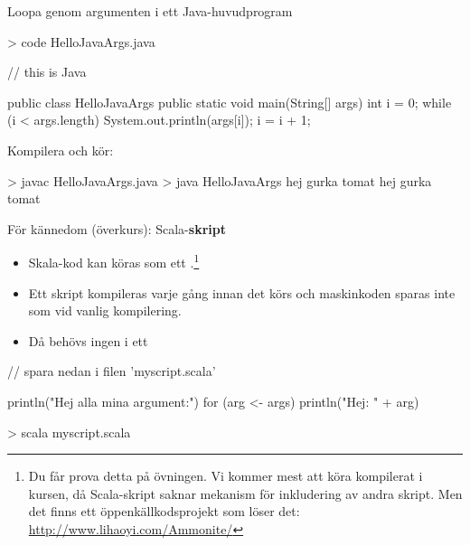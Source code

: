 \begin{Slide}{Loopa genom argumenten i ett Java-huvudprogram}
\begin{REPLnonum}
> code HelloJavaArgs.java
\end{REPLnonum}
\begin{Code}[language=Java]
// this is Java

public class HelloJavaArgs {
    public static void main(String[] args) {
    int i = 0;
    while (i < args.length) {
      System.out.println(args[i]);
      i = i + 1;
    }
  }
}
\end{Code}
Kompilera och kör:
\begin{REPL}
> javac HelloJavaArgs.java
> java HelloJavaArgs hej gurka tomat
hej
gurka
tomat
\end{REPL}

\end{Slide}


\begin{Slide}{För kännedom (överkurs): Scala-\textbf{skript}}
\begin{itemize}
\item Skala-kod kan köras som ett .\footnote{\SlideFontTiny Du får prova detta på övningen. Vi kommer mest att köra kompilerat i kursen, då Scala-skript saknar mekanism för inkludering av andra skript. Men det finns ett öppenkällkodsprojekt som löser det: \url{http://www.lihaoyi.com/Ammonite/}
}
\item Ett skript kompileras varje gång innan det körs och maskinkoden sparas inte som vid vanlig kompilering.
\item Då behövs ingen  i ett 
\end{itemize}

\begin{Code}[basicstyle=\ttfamily\fontsize{10}{12}\selectfont]
// spara nedan i filen 'myscript.scala'

println("Hej alla mina argument:")
for (arg <- args) println("Hej: " + arg)
\end{Code}

\begin{REPLnonum}
> scala myscript.scala
\end{REPLnonum}


\end{Slide}




